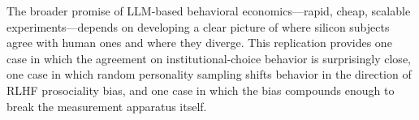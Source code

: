 \documentclass[12pt, a4paper]{article}
\begin{document}
The broader promise of LLM-based behavioral economics---rapid, cheap, scalable experiments---depends on developing a clear picture of where silicon subjects agree with human ones and where they diverge. This replication provides one case in which the agreement on institutional-choice behavior is surprisingly close, one case in which random personality sampling shifts behavior in the direction of RLHF prosociality bias, and one case in which the bias compounds enough to break the measurement apparatus itself.



\end{document}
